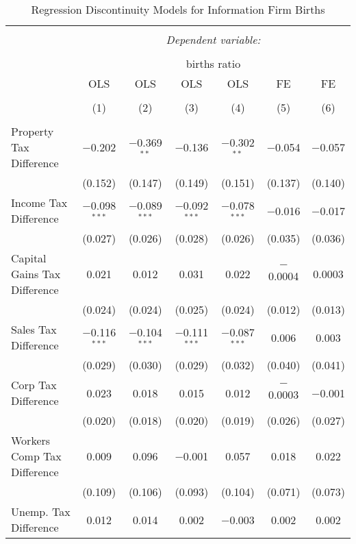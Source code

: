 
\begin{table}[!htbp] \centering 
  \caption{Regression Discontinuity Models for  Information Firm Births} 
  \label{51rd} 
\footnotesize 
\begin{tabular}{@{\extracolsep{5pt}}lcccccc} 
\\[-1.8ex]\hline 
\hline \\[-1.8ex] 
 & \multicolumn{6}{c}{\textit{Dependent variable:}} \\ 
\cline{2-7} 
\\[-1.8ex] & \multicolumn{6}{c}{births ratio} \\ 
 & OLS & OLS & OLS & OLS & FE & FE \\ 
\\[-1.8ex] & (1) & (2) & (3) & (4) & (5) & (6)\\ 
\hline \\[-1.8ex] 
 Property Tax Difference & $-$0.202 & $-$0.369$^{**}$ & $-$0.136 & $-$0.302$^{**}$ & $-$0.054 & $-$0.057 \\ 
  & (0.152) & (0.147) & (0.149) & (0.151) & (0.137) & (0.140) \\ 
  Income Tax Difference & $-$0.098$^{***}$ & $-$0.089$^{***}$ & $-$0.092$^{***}$ & $-$0.078$^{***}$ & $-$0.016 & $-$0.017 \\ 
  & (0.027) & (0.026) & (0.028) & (0.026) & (0.035) & (0.036) \\ 
  Capital Gains Tax Difference & 0.021 & 0.012 & 0.031 & 0.022 & $-$0.0004 & 0.0003 \\ 
  & (0.024) & (0.024) & (0.025) & (0.024) & (0.012) & (0.013) \\ 
  Sales Tax Difference & $-$0.116$^{***}$ & $-$0.104$^{***}$ & $-$0.111$^{***}$ & $-$0.087$^{***}$ & 0.006 & 0.003 \\ 
  & (0.029) & (0.030) & (0.029) & (0.032) & (0.040) & (0.041) \\ 
  Corp Tax Difference & 0.023 & 0.018 & 0.015 & 0.012 & $-$0.0003 & $-$0.001 \\ 
  & (0.020) & (0.018) & (0.020) & (0.019) & (0.026) & (0.027) \\ 
  Workers Comp Tax Difference & 0.009 & 0.096 & $-$0.001 & 0.057 & 0.018 & 0.022 \\ 
  & (0.109) & (0.106) & (0.093) & (0.104) & (0.071) & (0.073) \\ 
  Unemp. Tax Difference & 0.012 & 0.014 & 0.002 & $-$0.003 & 0.002 & 0.002 \\ 

\end{tabular}
\end{table}
